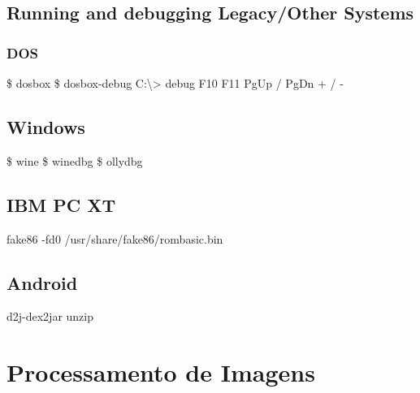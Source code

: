 \documentclass{refcard}
\begin{document}


\subsection{Running and debugging Legacy/Other Systems}

\subsubsection{DOS}

\begin{ldesc}
	 \$ dosbox 
	                   \$ dosbox-debug 
	       C:\textbackslash> debug 
	     F10
	     F11
	 PgUp / PgDn
	 + / -
\end{ldesc}

\subsection{Windows}

\begin{ldesc}
	   \$ wine 
	 \$ winedbg 
	 \$ ollydbg 
\end{ldesc}

\subsection{IBM PC XT}

\begin{ldesc}
	 fake86 -fd0 /usr/share/fake86/rombasic.bin
\end{ldesc}


\subsection{Android}

\begin{ldesc}
	   d2j-dex2jar 
	 unzip 
\end{ldesc}

\section{Processamento de Imagens}
\end{document}
